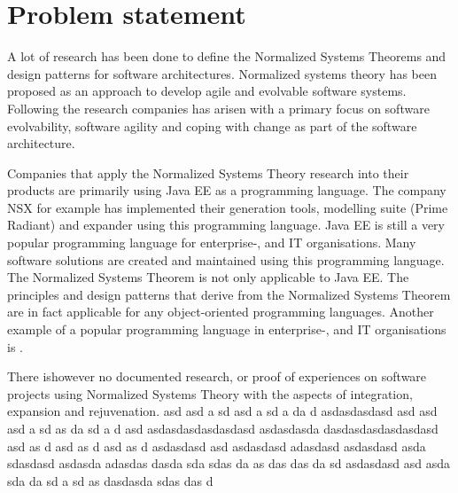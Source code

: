 
\chapter{Problem statement}

A lot of research has been done to define the Normalized Systems Theorems and
design patterns for software architectures. Normalized systems theory has been
proposed as an approach to develop agile and evolvable software systems. Following
the research companies has arisen with a primary focus on software evolvability,
software agility and coping with change as part of the software architecture. 

Companies that apply the Normalized Systems Theory research into their products
are primarily using Java EE as a programming language. The company NSX for example
has implemented their generation tools, modelling suite (Prime Radiant) and
expander using this programming language. Java EE is still a very popular
programming language for enterprise-, and IT organisations. Many software
solutions are created and maintained using this programming language. The
Normalized Systems Theorem is not only applicable to Java EE. The principles and
design patterns that derive from the Normalized Systems Theorem are in fact
applicable for any object-oriented programming languages. Another example of a
popular programming language in enterprise-, and IT organisations is . 

There ishowever no documented research, or proof of experiences on software
projects using Normalized Systems Theory with the aspects of integration,
expansion and rejuvenation. asd asd a sd asd a sd a da d asdasdasdasd asd asd asd
a sd as da sd a d   asd asdasdasdasdasdasd asdasdasda dasdasdasdasdasdasd asd as d
asd as d asd as d asdasdasd asd asdasdasd adasdasd asdasdasd asda sdasdasd asdasda
adasdas dasda sda sdas da as das das da sd asdasdasd asd asda sda da sd a sd as
dasdasda sdas das d
